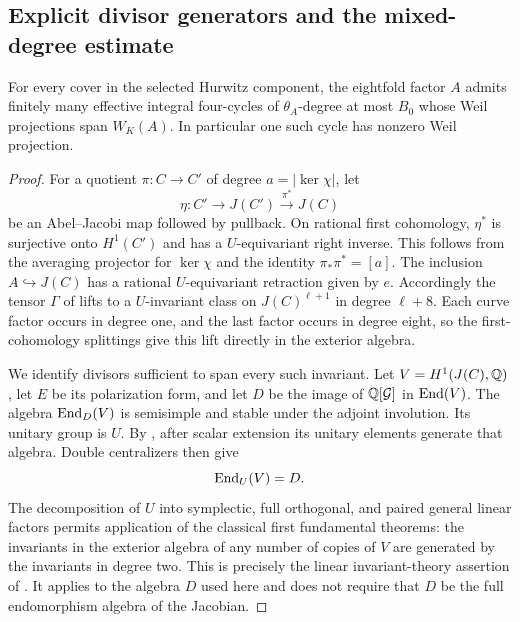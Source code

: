 \subsection{Explicit divisor generators and the mixed-degree estimate}

\begin{proposition}\label{SQ6}
For every cover in the selected Hurwitz component, the eightfold factor $A$ admits finitely many effective integral four-cycles of $\theta_A$-degree at most $B_0$ whose Weil projections span $W_K(A)$. In particular one such cycle has nonzero Weil projection.
\end{proposition}
\begin{proof}
For a quotient $\pi:C\to C'$ of degree $a=|\ker\chi|$, let
\[
 \eta:C'\longrightarrow J(C')\xrightarrow{\pi^*}J(C)
\]
be an Abel--Jacobi map followed by pullback. On rational first cohomology, $\eta^*$ is surjective onto $H^1(C')$ and has a $U$-equivariant right inverse. This follows from the averaging projector for $\ker\chi$ and the identity $\pi_*\pi^*=[a]$. The inclusion $A\hookrightarrow J(C)$ has a rational $U$-equivariant retraction given by $e$. Accordingly the tensor $\Gamma$ of  lifts to a $U$-invariant class on $J(C)^{\ell+1}$ in degree $\ell+8$. Each curve factor occurs in degree one, and the last factor occurs in degree eight, so the first-cohomology splittings give this lift directly in the exterior algebra.

We identify divisors sufficient to span every such invariant. Let $V=H^1(J(C),\mathbb Q)$, let $E$ be its polarization form, and let $D$ be the image of $\mathbb Q[\mathcal G]$ in $\operatorname{End}(V)$. The algebra $\operatorname{End}_D(V)$ is semisimple and stable under the adjoint involution. Its unitary group is $U$. By \citet[Lemma~3.5]{Milne99}, after scalar extension its unitary elements generate that algebra. Double centralizers then give
\[
 \operatorname{End}_U(V)=D.
\]
The decomposition of $U$ into symplectic, full orthogonal, and paired general linear factors permits application of the classical first fundamental theorems: the invariants in the exterior algebra of any number of copies of $V$ are generated by the invariants in degree two. This is precisely the linear invariant-theory assertion of \citet[Proposition~3.6 and Remark~3.7]{Milne99}. It applies to the algebra $D$ used here and does not require that $D$ be the full endomorphism algebra of the Jacobian.


\end{proof}
